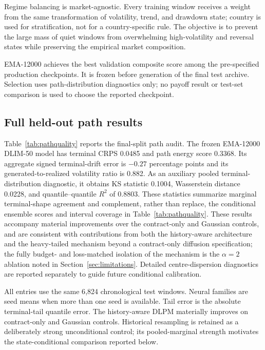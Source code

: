 ﻿\documentclass[12pt,letterpaper]{article}
\newcommand{\tabnote}[1]{\begin{minipage}{\linewidth}\vspace{4pt}\footnotesize\singlespacing #1\end{minipage}}
\begin{document}
Regime balancing is market-agnostic. Every training window receives a weight
from the same transformation of volatility, trend, and drawdown state; country
is used for stratification, not for a country-specific rule. The objective is
to prevent the large mass of quiet windows from overwhelming high-volatility
and reversal states while preserving the empirical market composition.

EMA-12000 achieves the best validation composite score among the pre-specified
production checkpoints. It is frozen before generation of the final test
archive. Selection uses path-distribution diagnostics only; no payoff result
or test-set comparison is used to choose the reported checkpoint.

\subsection{Full held-out path results}

Table~\ref{tab:pathquality} reports the final-split path audit. The frozen
EMA-12000 DLIM-50 model has terminal CRPS 0.0485 and path energy score 0.3368.
Its aggregate signed terminal-drift error is $-0.27$ percentage points and
its generated-to-realized volatility ratio is 0.882. As an auxiliary pooled
terminal-distribution diagnostic, it obtains KS statistic 0.1004,
Wasserstein distance 0.0228, and quantile--quantile $R^2$ of 0.8803. These
statistics summarize marginal terminal-shape agreement and complement, rather
than replace, the conditional ensemble scores and interval coverage in
Table~\ref{tab:pathquality}. These results accompany
material improvements over the contract-only and Gaussian controls, and are
consistent with contributions from both the history-aware architecture and
the heavy-tailed mechanism beyond a contract-only diffusion specification;
the fully budget- and loss-matched isolation of the mechanism is the
$\alpha=2$ ablation noted in Section~\ref{sec:limitations}. Detailed centre-dispersion
diagnostics are reported separately to guide future conditional calibration.

\begin{table}[ht]
\singlespacing
\centering
\caption{Final-split held-out path quality and representative controls}
\label{tab:pathquality}
\tabnote{All entries use the same 6{,}824 chronological test windows. Neural
families are seed means when more than one seed is available. Tail error is
the absolute terminal-tail quantile error. The history-aware DLPM materially
improves on contract-only and Gaussian controls. Historical resampling is
retained as a deliberately strong unconditional control; its pooled-marginal
strength motivates the state-conditional comparison reported below.}
\end{table}
\end{document}
